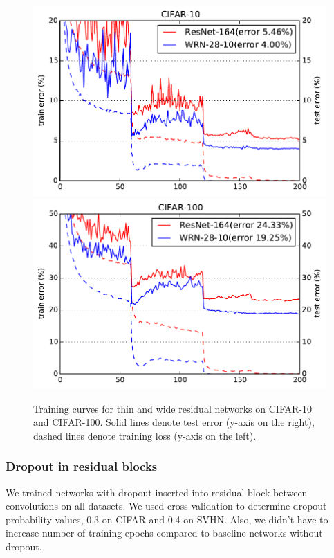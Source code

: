 \documentclass{bmvc2k}
\begin{document}
\begin{figure}
  \centering
  \includegraphics[scale=0.42]{./images/cifar10.pdf}
  \includegraphics[scale=0.42]{./images/cifar100.pdf} \caption{Training curves for thin and wide residual networks on CIFAR-10 and CIFAR-100. Solid lines denote test error (y-axis on the right), dashed lines denote training loss (y-axis on the left).}
  \label{fig:cifar}
\end{figure}


\subsubsection*{Dropout in  residual blocks} We trained networks with dropout inserted into residual block between convolutions on all datasets. We used cross-validation to determine dropout probability values, 0.3 on CIFAR and 0.4 on SVHN. Also, we didn't have to increase number of training epochs compared to baseline networks without dropout.
\end{document}
